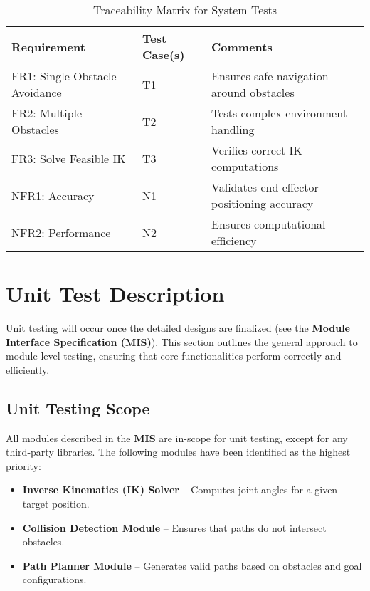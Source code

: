 \documentclass[12pt, titlepage]{article}
\begin{document}
\begin{table}[h!]
  \centering
  \caption{Traceability Matrix for System Tests}
  \begin{tabular}{l l l}
  \toprule
  \textbf{Requirement} & \textbf{Test Case(s)} & \textbf{Comments} \\
  \midrule
  FR1: Single Obstacle Avoidance & T1 & Ensures safe navigation around obstacles \\
  FR2: Multiple Obstacles & T2 & Tests complex environment handling \\
  FR3: Solve Feasible IK & T3 & Verifies correct IK computations \\
  NFR1: Accuracy & N1 & Validates end-effector positioning accuracy \\
  NFR2: Performance & N2 & Ensures computational efficiency \\
  \bottomrule
  \end{tabular}
\end{table}


\section{Unit Test Description}

Unit testing will occur once the detailed designs are finalized (see the \textbf{Module Interface Specification (MIS)}). This section outlines the general approach to module-level testing, ensuring that core functionalities perform correctly and efficiently.

\subsection{Unit Testing Scope}

All modules described in the \textbf{MIS} are in-scope for unit testing, except for any third-party libraries. The following modules have been identified as the highest priority:

\begin{itemize}
    \item \textbf{Inverse Kinematics (IK) Solver} -- Computes joint angles for a given target position.
    \item \textbf{Collision Detection Module} -- Ensures that paths do not intersect obstacles.
    \item \textbf{Path Planner Module} -- Generates valid paths based on obstacles and goal configurations.
\end{itemize}
\end{document}
